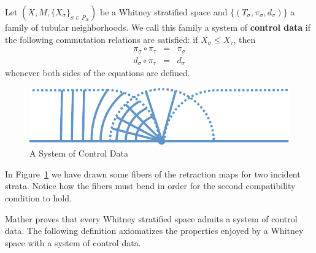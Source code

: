 \begin{defn}
	Let $(X,M,\{X_{\sigma}\}_{\sigma\in P_X})$ be a Whitney stratified space and $\{(T_{\sigma},\pi_{\sigma},d_{\sigma})\}$ a family of tubular neighborhoods. We call this family a system of \textbf{control data} if the following commutation relations are satisfied: if $X_{\sigma}\leq X_{\tau}$, then
	\begin{eqnarray*}
		\pi_{\sigma}\circ \pi_{\tau} &=& \pi_{\sigma} \\
		d_{\sigma}\circ \pi_{\tau}&=& d_{\sigma}
	\end{eqnarray*}
whenever both sides of the equations are defined.
\end{defn}

\begin{figure}
	\centering
	\includegraphics[width=.9\textwidth]{control.pdf}
	\caption{A System of Control Data}
	\label{fig:control}
\end{figure}
\begin{rmk}
In Figure~\ref{fig:control} we have drawn some fibers of the retraction maps for two incident strata. Notice how the fibers must bend in order for the second compatibility condition to hold.
\end{rmk}

Mather proves that every Whitney stratified space admits a system of control data. The following definition axiomatizes the properties enjoyed by a Whitney space with a system of control data.

